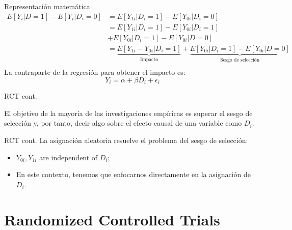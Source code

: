 \documentclass[11pt, aspectratio=169, compress]{beamer}
\begin{document}
\begin{frame}{Representación matemática}
\begin{align*}
E[Y_i | D=1] - E[Y_i | D_i=0] &= E[Y_{1i} | D_i=1] - E[Y_{0i} | D_i=0] \\
&= E[Y_{1i} | D_i=1] - E[Y_{0i} | D_i=1] \\
&+ E[Y_{0i} | D_i=1] - E[Y_{0i} | D=0] \\ 
&= \underbrace{E[Y_{1i} - Y_{0i} | D_i=1]}_{\text{Impacto}} +  \underbrace{E[Y_{0i} | D_i=1] - E[Y_{0i} | D=0]}_{\text{Sesgo de selección}}\\ 
\end{align*}
La contraparte de la regresión para obtener el impacto es:
\begin{equation}
Y_i = \alpha + \beta D_{i} + \epsilon_i 
\end{equation}
\end{frame}
\begin{frame}{RCT cont.}
	\begin{center}
		El objetivo de la mayoría de las investigaciones empíricas es superar el sesgo de selección y, por tanto, decir algo sobre el efecto causal de una variable como $D_i$. 
	\end{center}
\end{frame}
\begin{frame}{RCT cont.}
	La asignación aleatoria resuelve el problema del sesgo de selección: 
	\begin{itemize}
		\item $Y_{0i}, Y_{1i}$ are independent of $D_i$; 
		\item En este contexto, tenemos que enfocarnos directamente en la asignación de $D_i$.
	\end{itemize}
\end{frame}
\section{Randomized Controlled Trials}
\end{document}
